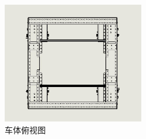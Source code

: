 \documentclass[10pt]{ctexart}
\begin{document}
\begin{enumerate}
          \begin{figure}[H]
              \centering
              \includegraphics[width = 0.55\textwidth]{machinery/car_top.jpg}
              \caption{车体俯视图}
              \label{fig:car_top}
          \end{figure}
\end{enumerate}
\end{document}
